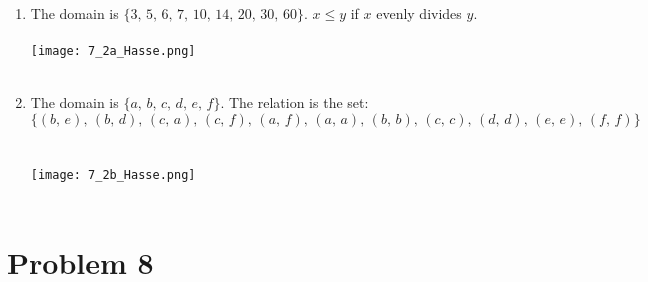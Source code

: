 \documentclass{amsart}
\theoremstyle{definition}
\theoremstyle{Exercise}
\theoremstyle{remark}
\theoremstyle{rule}
\numberwithin{equation}{section}
\begin{document}
\begin{enumerate}[label=(\alph*)]
\item The domain is $\{3,\, 5,\, 6,\, 7,\, 10,\, 14,\, 20,\, 30,\, 60\}$. $x \leq y$ if $x$ evenly divides $y$.\\\\

\texttt{[image: 7\_2a\_Hasse.png]}\\\\

\item The domain is $\{a,\, b,\, c,\, d,\, e,\, f\}$. The relation is the set:
\[
\{ (b,\, e),\, (b,\, d),\, (c,\, a),\, (c,\, f),\, (a,\, f),\, (a,\, a),\, (b,\, b),\, (c, \,c),\, (d,\, d),\, (e, \,e), \,(f,\, f) \}
\]\\\\

\texttt{[image: 7\_2b\_Hasse.png]}\\\\

\end{enumerate}

\newpage%
\vspace*{0.25in}
\section*{Problem 8}
\end{document}
